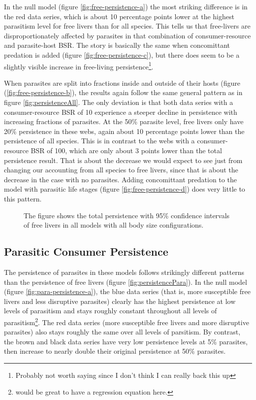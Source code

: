 \documentclass[11pt]{amsart}
\begin{document}
In the null model (figure \ref{fig:free-persistence-a}) the most striking difference is in the red data series, which is about 10 percentage points lower at the highest parasitism level for free livers than for all species.  This tells us that free-livers are disproportionately affected by parasites in that combination of consumer-resource and parasite-host BSR.  The story is basically the same when concomittant predation is added (figure \ref{fig:free-persistence-c}), but there does seem to be a slightly visible increase in free-living persistence\footnote{Probably not worth saying since I don't think I can really back this up}.   

When parasites are split into fractions inside and outside of their hosts (figure (\ref{fig:free-persistence-b}), the results again follow the same general pattern as in figure \ref{fig:persistenceAll}.  The only deviation is that both data series with a consumer-resource BSR of 10 experience a steeper decline in persistence with increasing fractions of parasites.  At the 50\% parasite level, free livers only have 20\% persistence in these webs, again about 10 percentage points lower than the persistence of all species. This is in contrast to the webs with a consumer-resource BSR of 100, which are only about 3 points lower than the total persistence result.  That is about the decrease we would expect to see just from changing our accounting from all species to free livers, since that is about the decrease in the case with no parasites.  Adding concomittant predation to the model with parasitic life stages (figure \ref{fig:free-persistence-d}) does very little to this pattern. 

\begin{figure}[h]
\caption{The figure shows the total persistence with 95\% confidence intervals of free livers in all models with all body size configurations.}
\label{fig:persistenceFree}
\end{figure}

\subsection{Parasitic Consumer Persistence \label{sec:persistencePara}}

The persistence of parasites in these models follows strikingly different patterns than the persistence of free livers (figure \ref{fig:persistencePara}).  In the null model (figure \ref{fig:para-persistence-a}), the blue data series (that is, more susceptible free livers and less disruptive parasites) clearly has the highest persistence at low levels of parasitism and stays roughly constant throughout all levels of parasitism\footnote{would be great to have a regression equation here.}.  The red data series (more susceptible free livers and more disruptive parasites) also stays roughly the same over all levels of parsitism.   By contrast, the brown and black data series have very low persistence levels at 5\% parasites, then increase to nearly double their original persistence at 50\% parasites.
\end{document}
